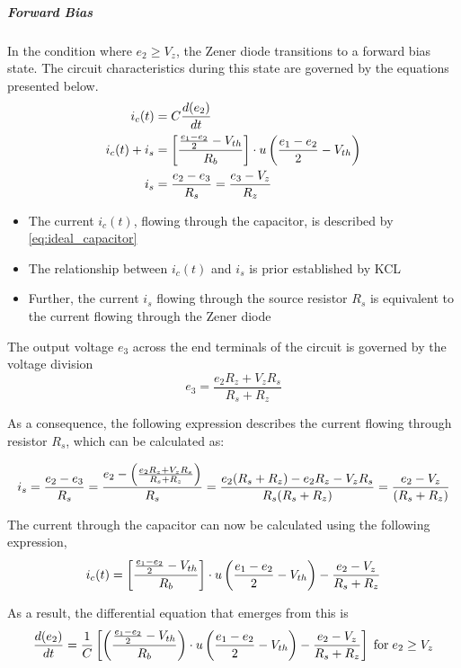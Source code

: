 \subparagraph{Forward Bias}
In the condition where $e_2 \geq V_z$, the Zener diode transitions to a forward bias state. The circuit characteristics during this state are governed by the equations presented below.
\begin{align}
    i_c(t) &= C\frac{d(e_2)}{dt}\\
    i_c(t) + i_s &= \left[\frac{\frac{e_1 - e_2}{2} - V_{th}}{R_b} \right]\cdot u\left(\frac{e_1 - e_2}{2} - V_{th} \right)\\
    i_s &= \frac{e_2-e_3}{R_s}=\frac{e_3-V_z}{R_z}
\end{align}
\begin{itemize}
	\item The current $i_c(t)$, flowing through the capacitor, is described by \eqref{eq:ideal_capacitor}
	\item The relationship between $i_c(t)$ and $i_s$ is prior established by KCL
	\item Further, the current $i_s$ flowing through the source resistor $R_s$ is equivalent to the current flowing through the Zener diode
\end{itemize}

The output voltage $e_3$ across the end terminals of the circuit is governed by the voltage division
\begin{equation}
    e_3=\frac{e_2R_z+V_zR_s}{R_s+R_z}
\end{equation}

As a consequence, the following expression describes the current flowing through resistor $R_s$, which can be calculated as:

\begin{equation}
    i_s=\frac{e_2-e_3}{R_s}=\frac{e_2-\left(\frac{e_2R_z+V_zR_s}{R_s+R_z} \right)}{R_s}=\frac{e_2(R_s+R_z)-e_2R_z-V_zR_s}{R_s(R_s+R_z)}=\frac{e_2-V_z}{(R_s+R_z)}
\end{equation}

The current through the capacitor can now be calculated using the following expression,
\begin{equation}
    i_c(t) = \left[\frac{\frac{e_1 - e_2}{2} - V_{th}}{R_b} \right]\cdot u\left(\frac{e_1 - e_2}{2} - V_{th} \right)-\frac{e_2-V_z}{R_s+R_z}
\end{equation}

As a result, the differential equation that emerges from this is
\begin{equation}
    \frac{d(e_2)}{dt}=\frac{1}{C}\left[\left(\frac{\frac{e_1 - e_2}{2} - V_{th}}{R_b} \right)\cdot u\left(\frac{e_1 - e_2}{2} - V_{th} \right)-\frac{e_2-V_z}{R_s+R_z} \right] \hspace{0.1cm} \text{for} \hspace{0.1cm} e_2 \geq V_z
\end{equation}


